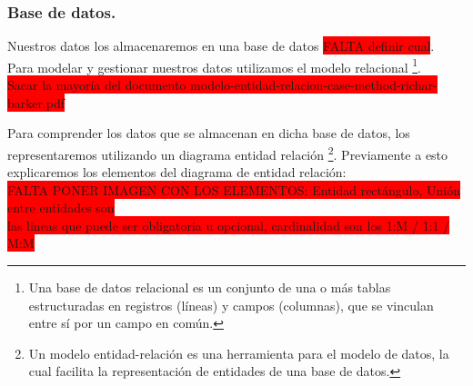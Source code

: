 \documentclass[12pt,a4paper]{article}
\begin{document}
\cleardoublepage

\subsubsection{Base de datos.}

Nuestros datos los almacenaremos en una base de datos \colorbox{red}{FALTA definir cual}. \\
Para modelar y gestionar nuestros datos utilizamos el modelo relacional \footnote{Una base de datos relacional es un conjunto de una o más tablas estructuradas en registros (líneas) y campos (columnas), que se vinculan entre sí por un campo en común.}.\\
\colorbox{red}{Sacar la mayoría del documento modelo-entidad-relacion-case-method-richar-barker.pdf} 

Para comprender los datos que se almacenan en dicha base de datos, los representaremos utilizando un diagrama entidad relación \footnote{Un modelo entidad-relación es una herramienta para el modelo de datos, la cual facilita la representación de entidades de una base de datos.}.
Previamente a esto explicaremos los elementos del diagrama de entidad relación: \\
\colorbox{red}{FALTA PONER IMAGEN CON LOS ELEMENTOS: Entidad rectángulo, Unión entre entidades son} \\ \colorbox{red}{las lineas que puede ser obligatoria u opcional, cardinalidad son los 1:M / 1:1 / M:M}
\end{document}
